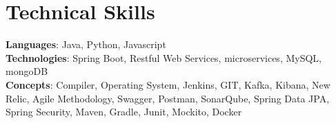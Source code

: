 \section{Technical Skills}
    \begin{itemize}[leftmargin=0.15in, label={}]
	\small{\item{
		\textbf{Languages}{: Java, Python, Javascript} \\
		\textbf{Technologies}{: Spring Boot, Restful Web Services, microservices, MySQL, mongoDB} \\
		\textbf{Concepts}{: Compiler, Operating System, Jenkins, GIT, Kafka, Kibana, New Relic, Agile Methodology, Swagger, Postman, SonarQube, Spring Data JPA, Spring Security, Maven, Gradle, Junit, Mockito, Docker}
	}}
    \end{itemize}